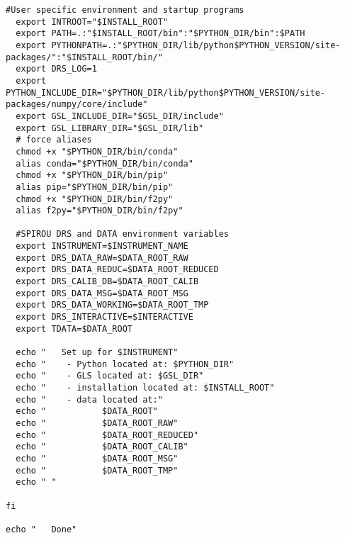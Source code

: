 \begin{lstlisting}[style=text]
  #User specific environment and startup programs
  export INTROOT="$INSTALL_ROOT"
  export PATH=.:"$INSTALL_ROOT/bin":"$PYTHON_DIR/bin":$PATH
  export PYTHONPATH=.:"$PYTHON_DIR/lib/python$PYTHON_VERSION/site-packages/":"$INSTALL_ROOT/bin/"
  export DRS_LOG=1
  export PYTHON_INCLUDE_DIR="$PYTHON_DIR/lib/python$PYTHON_VERSION/site-packages/numpy/core/include"
  export GSL_INCLUDE_DIR="$GSL_DIR/include"
  export GSL_LIBRARY_DIR="$GSL_DIR/lib"
  # force aliases
  chmod +x "$PYTHON_DIR/bin/conda"
  alias conda="$PYTHON_DIR/bin/conda"
  chmod +x "$PYTHON_DIR/bin/pip"
  alias pip="$PYTHON_DIR/bin/pip"
  chmod +x "$PYTHON_DIR/bin/f2py"
  alias f2py="$PYTHON_DIR/bin/f2py"
  
  #SPIROU DRS and DATA environment variables
  export INSTRUMENT=$INSTRUMENT_NAME
  export DRS_DATA_RAW=$DATA_ROOT_RAW
  export DRS_DATA_REDUC=$DATA_ROOT_REDUCED
  export DRS_CALIB_DB=$DATA_ROOT_CALIB
  export DRS_DATA_MSG=$DATA_ROOT_MSG
  export DRS_DATA_WORKING=$DATA_ROOT_TMP
  export DRS_INTERACTIVE=$INTERACTIVE
  export TDATA=$DATA_ROOT
  
  echo "   Set up for $INSTRUMENT"
  echo "    - Python located at: $PYTHON_DIR"
  echo "    - GLS located at: $GSL_DIR"
  echo "    - installation located at: $INSTALL_ROOT"
  echo "    - data located at:"
  echo "           $DATA_ROOT"
  echo "           $DATA_ROOT_RAW"
  echo "           $DATA_ROOT_REDUCED"
  echo "           $DATA_ROOT_CALIB"
  echo "           $DATA_ROOT_MSG"
  echo "           $DATA_ROOT_TMP"
  echo " "
  
fi

echo "   Done"
\end{lstlisting}  